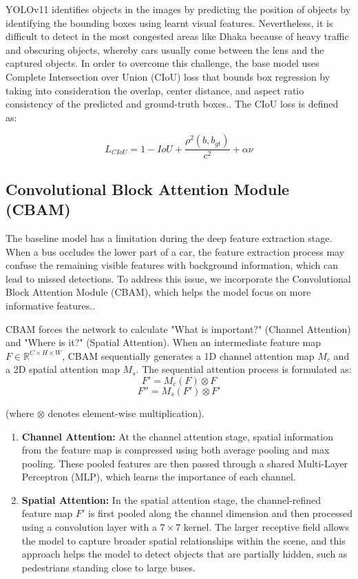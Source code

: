 \documentclass[conference]{IEEEtran}
\begin{document}
YOLOv11 identifies objects in the images by predicting the position of objects by identifying the bounding boxes using learnt visual features. Nevertheless, it is difficult to detect in the most congested areas like Dhaka because of heavy traffic and obscuring objects, whereby cars usually come between the lens and the captured objects. In order to overcome this challenge, the base model uses Complete Intersection over Union (CIoU) loss that bounds box regression by taking into consideration the overlap, center distance, and aspect ratio consistency of the predicted and ground-truth boxes.. The CIoU loss is defined as:

\begin{equation}
L_{CIoU} = 1 - IoU + \frac{\rho^2(b, b_{gt})}{c^2} + \alpha \nu
\end{equation}


\subsection{Convolutional Block Attention Module (CBAM)}
The baseline model has a limitation during the deep feature extraction stage. When a bus occludes the lower part of a car, the feature extraction process may confuse the remaining visible features with background information, which can lead to missed detections. To address this issue, we incorporate the Convolutional Block Attention Module (CBAM)\cite{Woo2018CBAM}, which helps the model focus on more informative features..

CBAM forces the network to calculate "What is important?" (Channel Attention) and "Where is it?" (Spatial Attention). When an intermediate feature map $F \in \mathbb{R}^{C \times H \times W}$, CBAM sequentially generates a 1D channel attention map $M_{c}$ and a 2D spatial attention map $M_{s}$. The sequential attention process is formulated as:
\[
F' = M_{c}(F) \otimes F
\]
\[
F'' = M_{s}(F') \otimes F'
\]


(where $\otimes$ denotes element-wise multiplication).

\begin{enumerate}
    \item \textbf{Channel Attention:} At the channel attention stage, spatial information from the feature map is compressed using both average pooling and max pooling. These pooled features are then passed through a shared Multi-Layer Perceptron (MLP), which learns the importance of each channel.
    
    \item \textbf{Spatial Attention:} In the spatial attention stage, the channel-refined feature map $F'$ is first pooled along the channel dimension and then processed using a convolution layer with a $7 \times 7$ kernel. The larger receptive field allows the model to capture broader spatial relationships within the scene, and this approach helps the model to detect objects that are partially hidden, such as pedestrians standing close to large buses.

\end{enumerate}
\end{document}
